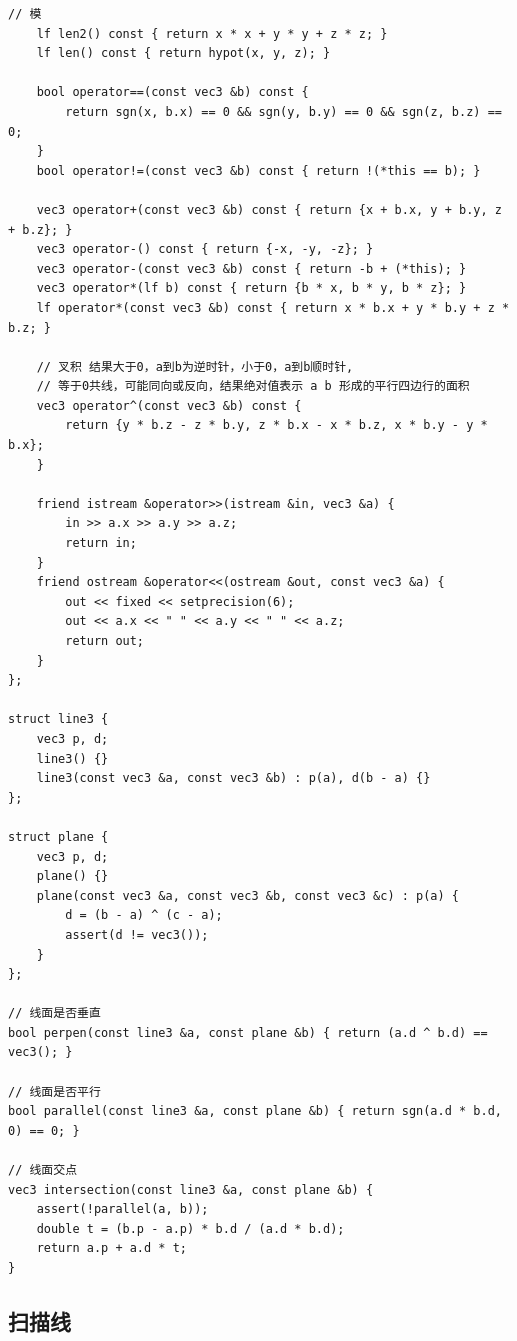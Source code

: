 \documentclass[UTF8, twoside]{ctexart}
\begin{document}
\begin{sloppypar}
\begin{lstlisting}[style=cpp]
    // 模
    lf len2() const { return x * x + y * y + z * z; }
    lf len() const { return hypot(x, y, z); }

    bool operator==(const vec3 &b) const {
        return sgn(x, b.x) == 0 && sgn(y, b.y) == 0 && sgn(z, b.z) == 0;
    }
    bool operator!=(const vec3 &b) const { return !(*this == b); }

    vec3 operator+(const vec3 &b) const { return {x + b.x, y + b.y, z + b.z}; }
    vec3 operator-() const { return {-x, -y, -z}; }
    vec3 operator-(const vec3 &b) const { return -b + (*this); }
    vec3 operator*(lf b) const { return {b * x, b * y, b * z}; }
    lf operator*(const vec3 &b) const { return x * b.x + y * b.y + z * b.z; }

    // 叉积 结果大于0，a到b为逆时针，小于0，a到b顺时针,
    // 等于0共线，可能同向或反向，结果绝对值表示 a b 形成的平行四边行的面积
    vec3 operator^(const vec3 &b) const {
        return {y * b.z - z * b.y, z * b.x - x * b.z, x * b.y - y * b.x};
    }

    friend istream &operator>>(istream &in, vec3 &a) {
        in >> a.x >> a.y >> a.z;
        return in;
    }
    friend ostream &operator<<(ostream &out, const vec3 &a) {
        out << fixed << setprecision(6);
        out << a.x << " " << a.y << " " << a.z;
        return out;
    }
};

struct line3 {
    vec3 p, d;
    line3() {}
    line3(const vec3 &a, const vec3 &b) : p(a), d(b - a) {}
};

struct plane {
    vec3 p, d;
    plane() {}
    plane(const vec3 &a, const vec3 &b, const vec3 &c) : p(a) {
        d = (b - a) ^ (c - a);
        assert(d != vec3());
    }
};

// 线面是否垂直
bool perpen(const line3 &a, const plane &b) { return (a.d ^ b.d) == vec3(); }

// 线面是否平行
bool parallel(const line3 &a, const plane &b) { return sgn(a.d * b.d, 0) == 0; }

// 线面交点
vec3 intersection(const line3 &a, const plane &b) {
    assert(!parallel(a, b));
    double t = (b.p - a.p) * b.d / (a.d * b.d);
    return a.p + a.d * t;
}
\end{lstlisting}

\subsection{扫描线}


\end{sloppypar}
\end{document}
